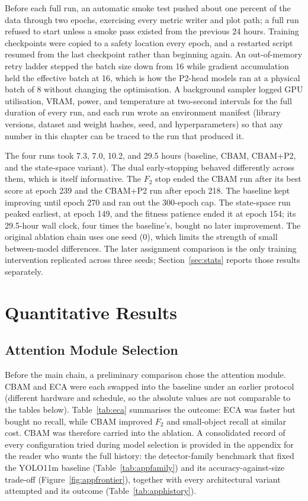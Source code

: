 Before each full run, an automatic smoke test pushed about one percent of the
data through two epochs, exercising every metric writer and plot path; a full
run refused to start unless a smoke pass existed from the previous 24 hours.
Training checkpoints were copied to a safety location every epoch, and a
restarted script resumed from the last checkpoint rather than beginning
again. An out-of-memory retry ladder stepped the batch size down from 16
while gradient accumulation held the effective batch at 16, which is how the
P2-head models ran at a physical batch of 8 without changing the
optimisation. A background sampler logged GPU utilisation, VRAM, power, and
temperature at two-second intervals for the full duration of every run, and
each run wrote an environment manifest (library versions, dataset and weight
hashes, seed, and hyperparameters) so that any number in this chapter can be
traced to the run that produced it.

The four runs took 7.3, 7.0, 10.2, and 29.5 hours (baseline, CBAM, CBAM+P2,
and the state-space variant). The dual early-stopping behaved differently
across them, which is itself informative. The $F_2$ stop ended the CBAM run
after its best score at epoch 239 and the CBAM+P2 run after epoch 218. The
baseline kept improving until epoch 270 and ran out the 300-epoch cap. The
state-space run peaked earliest, at epoch 149, and the fitness patience ended
it at epoch 154; its 29.5-hour wall clock, four times the baseline's, bought
no later improvement. The original ablation chain uses one seed (0), which
limits the strength of small between-model differences. The later assignment
comparison is the only training intervention replicated across three seeds;
Section~\ref{sec:stats} reports those results separately.

\section{Quantitative Results}
\label{sec:quant}

\subsection{Attention Module Selection}
Before the main chain, a preliminary comparison chose the attention module.
CBAM and ECA were each swapped into the baseline under an earlier protocol
(different hardware and schedule, so the absolute values are not comparable
to the tables below). Table~\ref{tab:eca} summarises the outcome: ECA was
faster but bought no recall, while CBAM improved $F_2$ and small-object
recall at similar cost. CBAM was therefore carried into the ablation. A
consolidated record of every configuration tried during model selection is
provided in the appendix for the reader who wants the full history: the
detector-family benchmark that fixed the YOLO11m baseline
(Table~\ref{tab:appfamily}) and its accuracy-against-size trade-off
(Figure~\ref{fig:appfrontier}), together with every architectural variant
attempted and its outcome (Table~\ref{tab:apphistory}).

